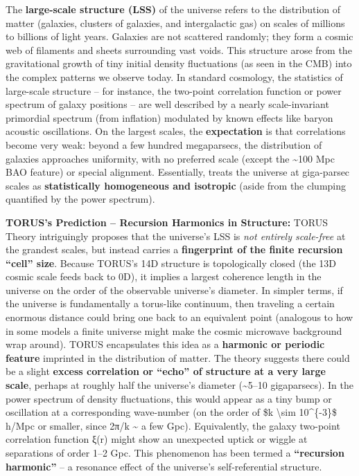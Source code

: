 \documentclass[
]{article}
\begin{document}
{The \textbf{large-scale structure (LSS)} of the universe refers to the
distribution of matter (galaxies, clusters of galaxies, and
intergalactic gas) on scales of millions to billions of light years.
Galaxies are not scattered randomly; they form a cosmic web of filaments
and sheets surrounding vast voids. This structure arose from the
gravitational growth of tiny initial density fluctuations (as seen in
the CMB) into the complex patterns we observe today. In standard \LambdaCDM
cosmology, the statistics of large-scale structure -- for instance, the
two-point correlation function or power spectrum of galaxy positions --
are well described by a nearly scale-invariant primordial spectrum (from
inflation) modulated by known effects like baryon acoustic oscillations.
On the largest scales, the \textbf{\LambdaCDM expectation} is that
correlations become very weak: beyond a few hundred megaparsecs, the
distribution of galaxies approaches uniformity, with no preferred scale
(except the \textasciitilde100 Mpc BAO feature) or special alignment.
Essentially, \LambdaCDM treats the universe at giga-parsec scales as
\textbf{statistically homogeneous and isotropic} (aside from the
clumping quantified by the power spectrum).

\textbf{TORUS's Prediction -- Recursion Harmonics in Structure:} TORUS
Theory intriguingly proposes that the universe's LSS is \emph{not
entirely scale-free} at the grandest scales, but instead carries a
\textbf{fingerprint of the finite recursion ``cell'' size}. Because
TORUS's 14D structure is topologically closed (the 13D cosmic scale
feeds back to 0D), it implies a largest coherence length in the universe
on the order of the observable universe's diameter. In simpler terms, if
the universe is fundamentally a torus-like continuum, then traveling a
certain enormous distance could bring one back to an equivalent point
(analogous to how in some models a finite universe might make the cosmic
microwave background wrap around). TORUS encapsulates this idea as a
\textbf{harmonic or periodic feature} imprinted in the distribution of
matter\hspace{0pt}. The theory suggests there could be a slight
\textbf{excess correlation or ``echo'' of structure at a very large
scale}, perhaps at roughly half the universe's diameter
(\textasciitilde5--10 gigaparsecs)\hspace{0pt}. In the power spectrum of
density fluctuations, this would appear as a tiny bump or oscillation at
a corresponding wave-number (on the order of \$k \textbackslash sim
10\^{}\{-3\}\$ h/Mpc or smaller, since 2π/k \textasciitilde{} a few
Gpc). Equivalently, the galaxy two-point correlation function ξ(r) might
show an unexpected uptick or wiggle at separations of order 1--2
Gpc\hspace{0pt}. This phenomenon has been termed a \textbf{``recursion
harmonic''} -- a resonance effect of the universe's self-referential
structure.

}
\end{document}
